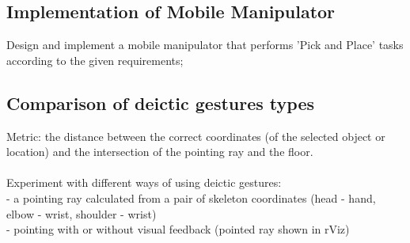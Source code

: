 \subsection{Implementation of Mobile Manipulator}
Design and implement a mobile manipulator that performs 'Pick and Place' tasks according to the given requirements;
\subsection{Comparison of deictic gestures types}
Metric: the distance between the correct coordinates (of the selected object or location) and the intersection of the pointing ray and the floor.\\ \\
Experiment with different ways of using deictic gestures:\\
- a pointing ray calculated from a pair of skeleton coordinates (head - hand, elbow - wrist, shoulder - wrist)\\
- pointing with or without visual feedback (pointed ray shown in rViz)\\



